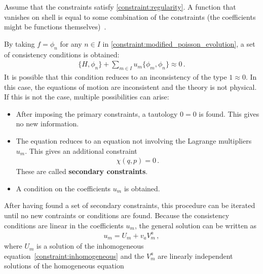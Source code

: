     \begin{property}\label{constraint:weakly_vanishing_functions}
        Assume that the constraints satisfy \cref{constraint:regularity}. A function that vanishes on shell is equal to some combination of the constraints (the coefficients might be functions themselves)~\citep[p.~70]{henneaux_quantization_1992}.
    \end{property}

    \begin{property}
        By taking $f=\phi_n$ for any $n\in I$ in \cref{constraint:modified_poisson_evolution}, a set of consistency conditions is obtained:
        \begin{gather}
            \label{constraint:inhomogeneous}
            \{H,\phi_n\} + \sum_{m\in I}u_m\{\phi_m,\phi_n\}\approx 0\,.
        \end{gather}
        It is possible that this condition reduces to an inconsistency of the type $1\approx0$. In this case, the equations of motion are inconsistent and the theory is not physical. If this is not the case, multiple possibilities can arise:
        \begin{itemize}
            \item After imposing the primary constraints, a tautology $0=0$ is found. This gives no new information.
            \item The equation reduces to an equation not involving the Lagrange multipliers $u_m$. This gives an additional constraint
                \begin{gather}
                    \chi(q,p)=0\,.
                \end{gather}
                These are called \textbf{secondary constraints}.
            \item A condition on the coefficients $u_m$ is obtained.
        \end{itemize}
        After having found a set of secondary constraints, this procedure can be iterated until no new contraints or conditions are found. Because the consistency conditions are linear in the coefficients $u_m$, the general solution can be written as
        \begin{gather}
            u_m = U_m + v_aV^a _m\,,
        \end{gather}
        where $U_m$ is a solution of the inhomogeneous equation~\eqref{constraint:inhomogeneous} and the $V^a_m$ are linearly independent solutions of the homogeneous equation
        \begin{gather}

\end{gather}
\end{property}
